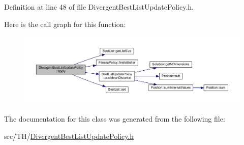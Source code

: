 Definition at line 48 of file Divergent\+Best\+List\+Update\+Policy.\+h.



Here is the call graph for this function\+:\nopagebreak
\begin{figure}[H]
\begin{center}
\leavevmode
\includegraphics[width=350pt]{classDivergentBestListUpdatePolicy_a793d47a0c458eef94b27fbee73e5df0e_cgraph}
\end{center}
\end{figure}




The documentation for this class was generated from the following file\+:\begin{DoxyCompactItemize}
\item 
src/\+T\+H/\hyperlink{DivergentBestListUpdatePolicy_8h}{Divergent\+Best\+List\+Update\+Policy.\+h}\end{DoxyCompactItemize}
